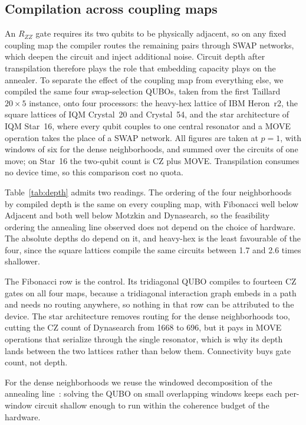 \documentclass{svproc}
\begin{document}
\subsection{Compilation across coupling maps}
\label{subsec:depth}
An $R_{ZZ}$ gate requires its two qubits to be physically adjacent, so on any
fixed coupling map the compiler routes the remaining pairs through SWAP
networks, which deepen the circuit and inject additional noise. Circuit depth
after transpilation therefore plays the role that embedding capacity plays on
the annealer. To separate the effect of the coupling map from everything else,
we compiled the same four swap-selection QUBOs, taken from the first Taillard
$20\times5$ instance, onto four processors: the heavy-hex lattice of IBM
Heron~r2, the square lattices of IQM Crystal~20 and Crystal~54, and the star
architecture of IQM Star~16, where every qubit couples to one central
resonator and a MOVE operation takes the place of a SWAP network. All
figures are taken at $p=1$, with windows of six for the dense neighborhoods,
and summed over the circuits of one move; on Star~16 the two-qubit count is CZ
plus MOVE. Transpilation consumes no device time, so this comparison cost no quota.

Table~\ref{tab:depth} admits two readings. The ordering of the four
neighborhoods by compiled depth is the same on every coupling map, with
Fibonacci well below Adjacent and both well below Motzkin and Dynasearch, so
the feasibility ordering the annealing line observed does not depend on the
choice of hardware. The absolute depths do depend on it, and heavy-hex is the
least favourable of the four, since the square lattices compile the same
circuits between 1.7 and 2.6 times shallower.

The Fibonacci row is the control. Its tridiagonal QUBO compiles to fourteen CZ
gates on all four maps, because a tridiagonal interaction graph embeds in a
path and needs no routing anywhere, so nothing in that row can be attributed
to the device. The star architecture removes routing for the dense
neighborhoods too, cutting the CZ count of Dynasearch from 1668 to 696, but it
pays in MOVE operations that serialize through the single resonator, which is
why its depth lands between the two lattices rather than below them.
Connectivity buys gate count, not depth.

For the dense neighborhoods we reuse the windowed decomposition of the
annealing line~\cite{wojewodzki2026windowed}: solving the QUBO on small
overlapping windows keeps each per-window circuit shallow enough to run within
the coherence budget of the hardware.
\end{document}
